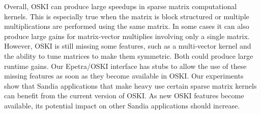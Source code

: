 Overall, OSKI can produce large speedups in sparse matrix computational kernels.  This is especially
true
when the matrix is block structured or multiple multiplications are performed
using the same matrix.  In some cases it can also produce large gains for matrix-vector
multiplies involving only a single matrix.  However, OSKI is still
missing some features, such as a multi-vector kernel and the ability to tune
matrices to make them symmetric. Both could produce large runtime gains.  Our Epetra/OSKI
interface has stubs to allow the use of these missing features as soon as they become available in
OSKI.  Our experiments show that Sandia applications that make heavy use certain sparse matrix kernels
can benefit from the current version of OSKI.  As new OSKI features
become available, its potential impact on other Sandia applications should increase.
